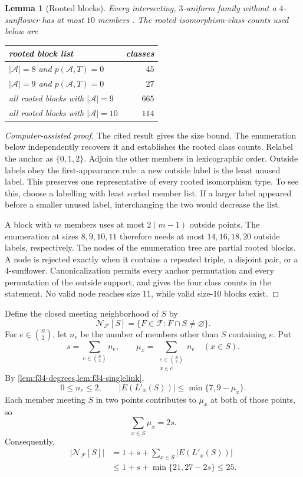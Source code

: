\documentclass[11pt]{article}
\numberwithin{equation}{section}
\newtheorem{lemma}[lemma]{Lemma}
\theoremstyle{definition}
\theoremstyle{remark}
\newcommand{\F}{\mathcal F}
\newcommand{\A}{\mathcal A}
\begin{document}
\begin{lemma}[Rooted blocks]
\label{lem:f34-block}
Every intersecting, $3$-uniform family without a $4$-sunflower has at most
$10$ members \cite[Proposition~6.3]{FranklWang2025}. The rooted
isomorphism-class counts used below are
\begin{center}
\begin{tabular}{@{}lr@{}}
\toprule
rooted block list & classes\\
\midrule
$|\A|=8$ and $p(\A,T)=0$ & $45$\\
$|\A|=9$ and $p(\A,T)=0$ & $27$\\
all rooted blocks with $|\A|=9$ & $665$\\
all rooted blocks with $|\A|=10$ & $114$\\
\bottomrule
\end{tabular}
\end{center}
\end{lemma}

\begin{proof}[Computer-assisted proof]
The cited result gives the size bound. The enumeration below independently
recovers it and establishes the rooted class counts.
Relabel the anchor as $\{0,1,2\}$. Adjoin the other members in lexicographic
order. Outside labels obey the first-appearance rule: a new outside label is
the least unused label. This preserves one representative of every rooted
isomorphism type. To see this, choose a labelling with least sorted member
list. If a larger label appeared before a smaller unused label, interchanging
the two would decrease the list.

A block with $m$ members uses at most $2(m-1)$ outside points. The
enumeration at sizes $8,9,10,11$ therefore needs at most $14,16,18,20$
outside labels, respectively. The nodes of the enumeration tree are partial
rooted blocks. A node is rejected exactly when it contains a repeated
triple, a disjoint pair, or a $4$-sunflower. Canonicalization
permits every anchor permutation and every permutation of the outside
support, and gives the four class counts in the statement. No valid node
reaches size $11$, while valid size-$10$ blocks exist.
\end{proof}

Define the closed meeting neighborhood of $S$ by
\[
 \mathcal N_{\F}[S]=\{F\in\F:F\cap S\ne\varnothing\}.
\]
For $e\in\binom S2$, let $n_e$ be the number of members other than $S$
containing $e$. Put
\[
 s=\sum_{e\in\binom S2}n_e,
 \qquad
 \mu_x=\sum_{\substack{e\in\binom S2\\x\in e}}n_e
 \quad(x\in S).
\]
By \cref{lem:f34-degrees,lem:f34-singlelink},
\[
 0\le n_e\le2,
 \qquad
 |E(L'_x(S))|\le\min\{7,9-\mu_x\}.
\]
Each member meeting $S$ in two points contributes to $\mu_x$ at both of
those points, so
\[
 \sum_{x\in S}\mu_x=2s.
\]
Consequently,
\begin{equation}
\begin{aligned}
 |\mathcal N_{\F}[S]|
  &=1+s+\sum_{x\in S}|E(L'_x(S))|\\
  &\le1+s+\min\{21,27-2s\}\le25.
\end{aligned}
\label{eq:f34-neighborhood25}
\end{equation}
\end{document}
